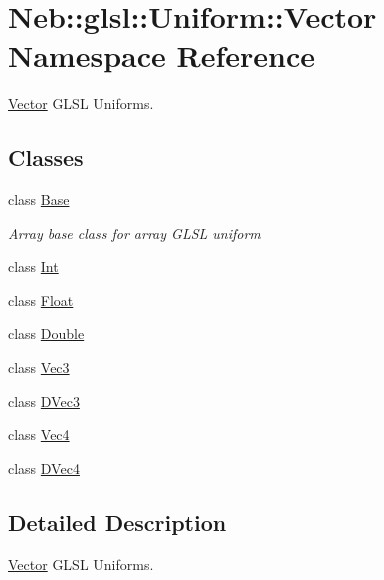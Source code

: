 \hypertarget{namespaceNeb_1_1glsl_1_1Uniform_1_1Vector}{\section{\-Neb\-:\-:glsl\-:\-:\-Uniform\-:\-:\-Vector \-Namespace \-Reference}
\label{namespaceNeb_1_1glsl_1_1Uniform_1_1Vector}
}


\hyperlink{namespaceNeb_1_1glsl_1_1Uniform_1_1Vector}{\-Vector} \-G\-L\-S\-L \-Uniforms.  


\subsection*{\-Classes}
\begin{DoxyCompactItemize}
\item 
class \hyperlink{classNeb_1_1glsl_1_1Uniform_1_1Vector_1_1Base}{\-Base}
\begin{DoxyCompactList}\small\item\em \-Array base class for array \-G\-L\-S\-L uniform \end{DoxyCompactList}\item 
class \hyperlink{classNeb_1_1glsl_1_1Uniform_1_1Vector_1_1Int}{\-Int}
\item 
class \hyperlink{classNeb_1_1glsl_1_1Uniform_1_1Vector_1_1Float}{\-Float}
\item 
class \hyperlink{classNeb_1_1glsl_1_1Uniform_1_1Vector_1_1Double}{\-Double}
\item 
class \hyperlink{classNeb_1_1glsl_1_1Uniform_1_1Vector_1_1Vec3}{\-Vec3}
\item 
class \hyperlink{classNeb_1_1glsl_1_1Uniform_1_1Vector_1_1DVec3}{\-D\-Vec3}
\item 
class \hyperlink{classNeb_1_1glsl_1_1Uniform_1_1Vector_1_1Vec4}{\-Vec4}
\item 
class \hyperlink{classNeb_1_1glsl_1_1Uniform_1_1Vector_1_1DVec4}{\-D\-Vec4}
\end{DoxyCompactItemize}


\subsection{\-Detailed \-Description}
\hyperlink{namespaceNeb_1_1glsl_1_1Uniform_1_1Vector}{\-Vector} \-G\-L\-S\-L \-Uniforms. 